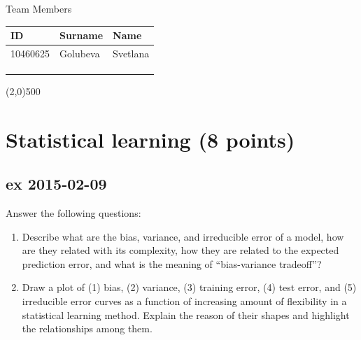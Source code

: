 \documentclass[a4paper,12pt,titlepage]{article} %
\begin{document}
\begin{titlepage}
		\vspace{20pt}
		
		\begin{center}
			{\large Team Members}
		\end{center}
		\begin{tabularx}{\textwidth}{|X|X|X|}
			\hline
			ID & Surname & Name\\
			\hline
			10460625 & Golubeva & Svetlana\\
			\hline
			&  & \\
			\hline
			&  & \\
			\hline
			&  & \\
			\hline
		\end{tabularx}
		
		\vspace{\fill}
		\begin{center}
			\line(2,0){500}
		\end{center}
		
	\end{titlepage}
\tableofcontents

\newpage
\listoftables

\listoffigures

\newpage
\section{Statistical learning (8 points)}
\subsection{ex 2015-02-09}
Answer the following questions:
\begin{enumerate}
\item Describe what are the bias, variance, and irreducible error of a model, how are they related with its complexity, how they are related to the expected prediction error, and what is the meaning of “bias-variance tradeoff”?
\item Draw a plot of (1) bias, (2) variance, (3) training error, (4) test error, and (5) irreducible error curves as a function of increasing amount of flexibility in a statistical learning method. Explain the reason of their shapes and highlight the relationships among them.
\end{enumerate}
\end{document}
